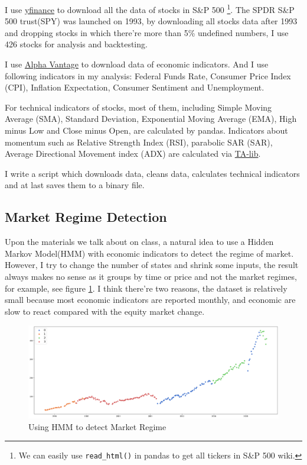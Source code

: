 \documentclass[a4paper,12pt]{article}
\begin{document}
I use \href{https://github.com/ranaroussi/yfinance}{yfinance} to download all the data of stocks in S\&P 500 \footnote[1]{We can easily use \lstinline{read_html()} in pandas to get all tickers in S\&P 500 wiki.}. The SPDR S\&P 500 trust(SPY) was launched on 1993, by downloading all stocks data after 1993 and dropping stocks in which there're more than 5\% undefined numbers, I use 426 stocks for analysis and backtesting.

I use \href{https://www.alphavantage.co/}{Alpha Vantage} to download data of economic indicators. And I use following indicators in my analysis: Federal Funds Rate, Consumer Price Index (CPI), Inflation Expectation, Consumer Sentiment and Unemployment.

For technical indicators of stocks, most of them, including Simple Moving Average (SMA), Standard Deviation, Exponential Moving Average (EMA), High minus Low and Close minus Open, are calculated by pandas. Indicators about momentum such as Relative Strength Index (RSI),  parabolic SAR (SAR), Average Directional Movement index (ADX) are calculated via \href{https://mrjbq7.github.io/ta-lib/}{TA-lib}.

I write a script which downloads data, cleans data, calculates technical indicators and at last saves them to a binary file.

\subsection{Market Regime Detection}

Upon the materials we talk about on class, a natural idea to use a Hidden Markov Model(HMM) with economic indicators to detect the regime of market. However, I try to change the number of states and shrink some inputs, the result always makes no sense as it groups by time or price and not the market regimes, for example, see figure \ref{hmm_figure}. I think there're two reasons, the dataset is relatively small because most economic indicators are reported monthly, and economic are slow to react compared with the equity market change.

\begin{figure}[H]
    \includegraphics[scale=0.3]{hmm_eco_indic.png}
    \caption{Using HMM to detect Market Regime}\label{hmm_figure}
\end{figure}
\end{document}
